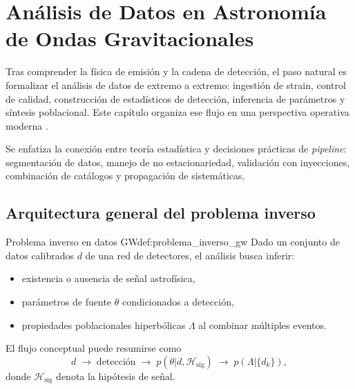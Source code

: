 
\chapter{Análisis de Datos en Astronomía de Ondas Gravitacionales}
\label{cap:analisis_datos_gw}

Tras comprender la física de emisión y la cadena de detección, el paso natural es formalizar el análisis de datos de extremo a extremo: ingestión de strain, control de calidad, construcción de estadísticos de detección, inferencia de parámetros y síntesis poblacional. Este capítulo organiza ese flujo en una perspectiva operativa moderna \cite{Creighton2011, Jaranowski2009, Allen2005, GWTC1, GWTC3, Maggiore2018}.

Se enfatiza la conexión entre teoría estadística y decisiones prácticas de \emph{pipeline}: segmentación de datos, manejo de no estacionariedad, validación con inyecciones, combinación de catálogos y propagación de sistemáticas.

\section{Arquitectura general del problema inverso}
\label{sec:arquitectura_problema_inverso}

\begin{definicion}{Problema inverso en datos GW}{def:problema_inverso_gw}
Dado un conjunto de datos calibrados $d$ de una red de detectores, el análisis busca inferir:
\begin{itemize}[leftmargin=2em]
  \item existencia o ausencia de señal astrofísica,
  \item parámetros de fuente $\theta$ condicionados a detección,
  \item propiedades poblacionales hiperbólicas $\Lambda$ al combinar múltiples eventos.
\end{itemize}
\end{definicion}

El flujo conceptual puede resumirse como
\begin{equation}
d \;\longrightarrow\; \text{detección} \;\longrightarrow\; p(\theta|d,\mathcal{H}_{\mathrm{sig}})
\;\longrightarrow\; p(\Lambda|\{d_k\}),
\end{equation}
donde $\mathcal{H}_{\mathrm{sig}}$ denota la hipótesis de señal.

